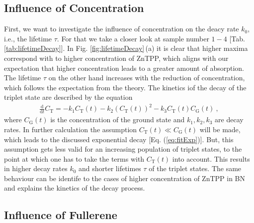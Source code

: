 \subsection{Influence of Concentration}
\label{sub:concentration}

First, we want to investigate the influence of concentration on the deacy rate $k_0$, i.e., the lifetime $\tau$. For that we take a closer look at sample number $1-4$ [Tab. \ref{tab:lifetimeDecay}]. In Fig. \ref{fig:lifetimeDecay}\,(a) it is clear that higher maxima correspond with to higher concentration of ZnTPP, which aligns with our expectation that higher concentration leads to a greater amount of absorption. The lifetime $\tau$ on the other hand increases with the reduction of concentration, which follows the expectation from the theory. The kinetics iof the decay of the triplet state are described by the equation
\begin{gather}
    \frac{\mathrm{d}}{\mathrm{d}t} C_\mathrm{T} = -k_1 C_\mathrm{T}(t) - k_2(C_\mathrm{T}(t))^2 - k_3C_\mathrm{T}(t)C_\mathrm{G}(t)~,
    \label{eq:kineticsTriplet}
\end{gather}
where $C_\mathrm{G}(t)$ is the concentration of the ground state and $k_1, k_2, k_3$ are decay rates. In further calculation the assumption $C_\mathrm{T}(t) \ll C_\mathrm{G}(t)$ will be made, which leads to the discussed exponential decay [Eq. (\ref{eq:fitExp})]. But, this assumption gets less valid for an increasing population of triplet states, to the point at which one has to take the terms with $C_\mathrm{T}(t)$ into account. This results in higher decay rates $k_0$ and shorter lifetimes $\tau$ of the triplet states. The same behaviour can be identife to the cases of higher concentration of ZnTPP in BN and explains the kinetics of the decay process.

\subsection{Influence of Fullerene }
\label{sub:fullerene}

